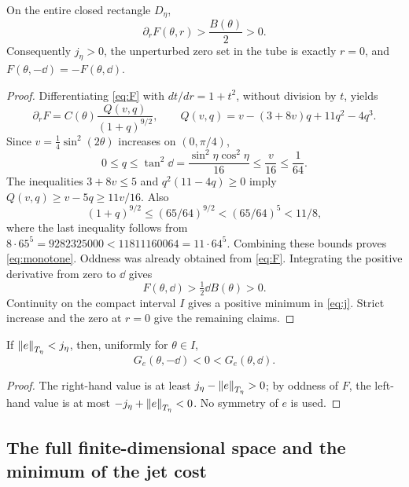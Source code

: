 \documentclass[11pt,a4paper]{article}
\begin{document}
\begin{lemma}\label{lem:monotone}
On the entire closed rectangle $D_\eta$,
\begin{equation}\label{eq:monotone}
 \partial_rF(\theta,r)>\frac{B(\theta)}2>0.
\end{equation}
Consequently $j_\eta>0$, the unperturbed zero set in the tube is exactly
$r=0$, and $F(\theta,-\dd)=-F(\theta,\dd)$.
\end{lemma}
\begin{proof}
Differentiating \eqref{eq:F} with $dt/dr=1+t^2$, without division by
$t$, yields
\begin{equation}\label{eq:Q}
 \partial_rF=C(\theta)\frac{Q(v,q)}{(1+q)^{9/2}},\qquad
 Q(v,q)=v-(3+8v)q+11q^2-4q^3.
\end{equation}
Since $v=\tfrac14\sin^2(2\theta)$ increases on $(0,\pi/4)$,
\[
 0\le q\le\tan^2\dd=\frac{\sin^2\eta\cos^2\eta}{16}
       \le\frac v{16}\le\frac1{64}.
\]
The inequalities $3+8v\le5$ and $q^2(11-4q)\ge0$ imply
$Q(v,q)\ge v-5q\ge11v/16$. Also
\[
 (1+q)^{9/2}\le(65/64)^{9/2}<(65/64)^5<11/8,
\]
where the last inequality follows from
$8\cdot65^5=9282325000<11811160064=11\cdot64^5$.
Combining these bounds proves \eqref{eq:monotone}.
Oddness was already obtained from \eqref{eq:F}. Integrating the positive
derivative from zero to $\dd$ gives
\[
 F(\theta,\dd)>\tfrac12\dd B(\theta)>0.
\]
Continuity on the compact interval $I$ gives a positive minimum in
\eqref{eq:j}. Strict increase and the zero at $r=0$ give the remaining
claims.
\end{proof}

\begin{corollary}\label{cor:signs}
If $\left\lVert e\right\rVert_{T_\eta}<j_\eta$, then, uniformly for $\theta\in I$,
\begin{equation}\label{eq:signs}
 G_e(\theta,-\dd)<0<G_e(\theta,\dd).
\end{equation}
\end{corollary}
\begin{proof}
The right-hand value is at least $j_\eta-\left\lVert e\right\rVert_{T_\eta}>0$; by oddness of
$F$, the left-hand value is at most $-j_\eta+\left\lVert e\right\rVert_{T_\eta}<0$.
No symmetry of $e$ is used.
\end{proof}

\subsection{The full finite-dimensional space and the minimum of the jet cost}
\label{sec:finite}
\end{document}
